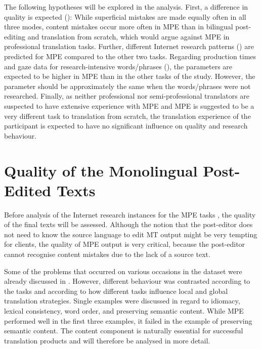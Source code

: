 \documentclass[output=paper]{langsci/langscibook}
\begin{document}
The following hypotheses will be explored in the analysis. First, a difference in quality is expected (): While superficial mistakes are made equally often in all three modes, content mistakes occur more often in MPE than in bilingual post-editing and translation from scratch, which would argue against MPE in professional translation tasks. Further, different Internet research patterns () are predicted for MPE compared to the other two tasks. Regarding production times and gaze data for research-intensive words/phrases (), the parameters are expected to be higher in MPE than in the other tasks of the study. However, the parameter should be approximately the same when the words/phrases were not researched. Finally, as neither professional nor semi-professional translators are suspected to have extensive experience with MPE and MPE is suggested to be a very different task to translation from scratch, the translation experience of the participant is expected to have no significant influence on quality and research behaviour.


\section{Quality of the Monolingual Post-Edited Texts\label{nitzke:sec:QualityOfTheMonolingual}}

\largerpage
Before analysis of the Internet research instances for the MPE tasks , the quality of the final texts will be assessed. Although the notion that the post-editor does not need to know the source language to edit MT output might be very tempting for clients, the quality of MPE output is very critical, because the post-editor cannot recognise content mistakes due to the lack of a source text.


Some of the problems that occurred on various occasions in the dataset were already discussed in \citet{Culo2014}. However, different behaviour was contrasted according to the tasks and according to how different tasks influence local and global translation strategies. Single examples were discussed in regard to idiomacy, lexical consistency, word order, and preserving semantic content. While MPE performed well in the first three examples, it failed in the example of preserving semantic content. The content component is naturally essential for successful translation products and will therefore be analysed in more detail.
\end{document}
